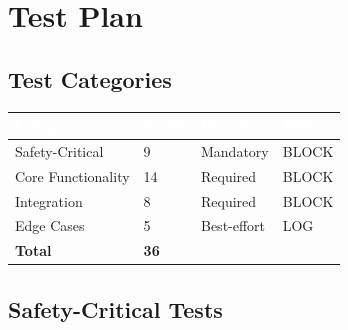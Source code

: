 \documentclass[11pt,letterpaper]{article}
\newcommand{\tableheader}[1]{\textbf{\sffamily\textcolor{white}{#1}}}
\begin{document}
\section{Test Plan}

\subsection{Test Categories}

\begin{center}
\begin{tabularx}{\textwidth}{L{3cm}C{1.5cm}C{1.5cm}C{1.5cm}}
\toprule
{}
\tableheader{Category} & \tableheader{Count} & \tableheader{Priority} & \tableheader{Failure} \\
\midrule
Safety-Critical & 9 & Mandatory & BLOCK \\
Core Functionality & 14 & Required & BLOCK \\
Integration & 8 & Required & BLOCK \\
Edge Cases & 5 & Best-effort & LOG \\
\midrule
\textbf{Total} & \textbf{36} & & \\
\bottomrule
\end{tabularx}
\end{center}

\subsection{Safety-Critical Tests}
\end{document}
